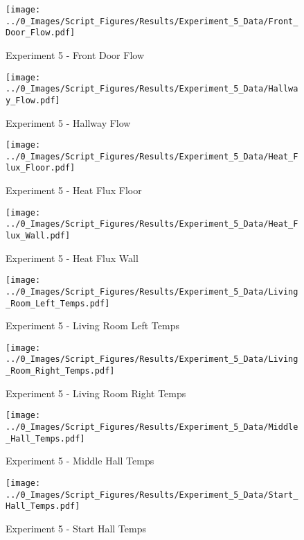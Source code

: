 	\begin{figure}[H]
		\centering
		\texttt{[image: ../0\_Images/Script\_Figures/Results/Experiment\_5\_Data/Front\_Door\_Flow.pdf]}
		\caption[]{Experiment 5 - Front Door Flow}
	\end{figure}
 
	\clearpage

	\begin{figure}[H]
		\centering
		\texttt{[image: ../0\_Images/Script\_Figures/Results/Experiment\_5\_Data/Hallway\_Flow.pdf]}
		\caption[]{Experiment 5 - Hallway Flow}
	\end{figure}
 

	\begin{figure}[H]
		\centering
		\texttt{[image: ../0\_Images/Script\_Figures/Results/Experiment\_5\_Data/Heat\_Flux\_Floor.pdf]}
		\caption[]{Experiment 5 - Heat Flux Floor}
	\end{figure}
 
	\clearpage

	\begin{figure}[H]
		\centering
		\texttt{[image: ../0\_Images/Script\_Figures/Results/Experiment\_5\_Data/Heat\_Flux\_Wall.pdf]}
		\caption[]{Experiment 5 - Heat Flux Wall}
	\end{figure}
 

	\begin{figure}[H]
		\centering
		\texttt{[image: ../0\_Images/Script\_Figures/Results/Experiment\_5\_Data/Living\_Room\_Left\_Temps.pdf]}
		\caption[]{Experiment 5 - Living Room Left Temps}
	\end{figure}
 
	\clearpage

	\begin{figure}[H]
		\centering
		\texttt{[image: ../0\_Images/Script\_Figures/Results/Experiment\_5\_Data/Living\_Room\_Right\_Temps.pdf]}
		\caption[]{Experiment 5 - Living Room Right Temps}
	\end{figure}
 

	\begin{figure}[H]
		\centering
		\texttt{[image: ../0\_Images/Script\_Figures/Results/Experiment\_5\_Data/Middle\_Hall\_Temps.pdf]}
		\caption[]{Experiment 5 - Middle Hall Temps}
	\end{figure}
 
	\clearpage

	\begin{figure}[H]
		\centering
		\texttt{[image: ../0\_Images/Script\_Figures/Results/Experiment\_5\_Data/Start\_Hall\_Temps.pdf]}
		\caption[]{Experiment 5 - Start Hall Temps}
	\end{figure}
 

